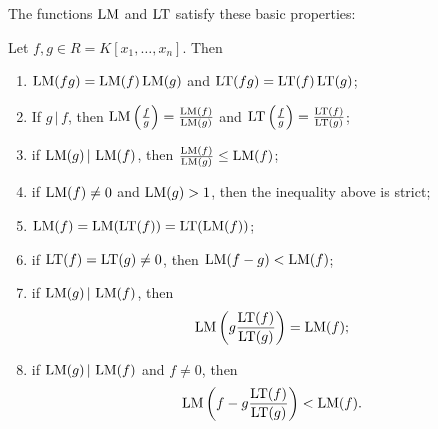The functions $\LM$ and $\LT$ satisfy these basic properties:
\begin{proposition}
  \label{prop_lm}
  Let $f, g \in R = K[x_1, \ldots, x_n]$. Then
  \begin{enumerate}[label=(\roman*)]
    \item $\LM(fg) = \LM(f)\LM(g)$ and $\LT(fg) = \LT(f)\LT(g)$;
    \item If $g \,|\, f$, then $\LM\left(\frac f g \right) = \frac{\LM(f)}{\LM(g)}$ and $\LT\left(\frac f g \right) = \frac{\LT(f)}{\LT(g)}$;
    \item if $\LM(g) \,|\, \LM(f)$, then $\frac{\LM(f)}{\LM(g)} \leq \LM(f)$;
    \item if $\LM(f) \neq 0$ and $\LM(g) > 1$, then the inequality above is strict;
    \item $\LM(f) = \LM(\LT(f)) = \LT(\LM(f))$;
    \item if $\LT(f) = \LT(g) \neq 0$, then $\LM(f - g) < \LM(f)$;
    \item if $\LM(g) \,|\, \LM(f)$, then \[ \LM\left( g \frac{\LT(f)}{\LT(g)} \right) = \LM(f); \]
    \item if $\LM(g) \,|\, \LM(f)$ and $f \neq 0$, then \[ \LM\left( f - g \frac{\LT(f)}{\LT(g)} \right) < \LM(f). \]
  \end{enumerate}
\end{proposition}
